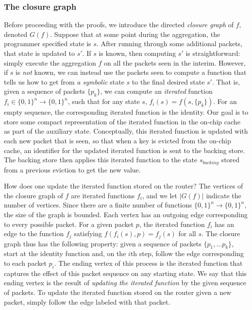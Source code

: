 \subsubsection{The closure graph}
\label{ss:closure}

Before proceeding with the proofs, we introduce the directed \emph{closure graph} of $f$, denoted $G(f)$. Suppose that at some point during the aggregation, 
the programmer specified state is $s$. After running through some additional packets, that state is updated to $s'$. If $s$ is known, then computing
$s'$ is straightforward: simply execute the aggregation $f$ on all the packets seen in the interim. However, if $s$ is \emph{not} known, we can instead
use the packets seen to compute a function that tells us how to get from \emph{a symbolic} state $s$ to the final desired state $s'$. That is, given a sequence of packets $\{p_k\}$,
we can compute an \emph{iterated} function $f_i \in \{0,1\}^n \rightarrow \{0,1\}^n$, such that for any state $s$, $f_i(s) = f(s, \{p_k\})$. For an empty sequence, the corresponding iterated function is the identity.
Our goal is to store some compact representation of the iterated function in the on-chip cache as part of the auxiliary state. Conceptually,  this iterated function is updated with each new packet that is seen, so that when a key is evicted from the on-chip cache,
an identifier for the updated iterated function is sent to the backing store. The backing store then applies this iterated function to the state $s_{backing}$ stored from a previous eviction to get the new value.

How does one update the iterated function stored on the router? The vertices of the closure graph of $f$ are iterated functions $f_i$, and we let $|G(f)|$ indicate the number of vertices. Since there are a finite number of functions $\{0, 1\}^n \rightarrow \{0, 1\}^n$, the size of the graph is bounded.
Each vertex has an outgoing edge corresponding to every possible packet. For a given packet $p$, the iterated function $f_i$ has an edge to the function $f_j$ satisfying $f(f_i(s), p) = f_j(s)$ for all $s$.
The closure graph thus has the following property: given a sequence of packets $\{p_1, \ldots p_k\}$, start at the identity function and, on the $i$th step, follow the edge corresponding to each packet $p_i$. The ending vertex of this process is the iterated function that captures the effect of this packet sequence on any starting state. We say that this ending vertex is the result of \emph{updating the iterated function} by the given sequence of packets. To update the iterated function stored on the router given a new packet, simply follow the edge labeled with that packet.

